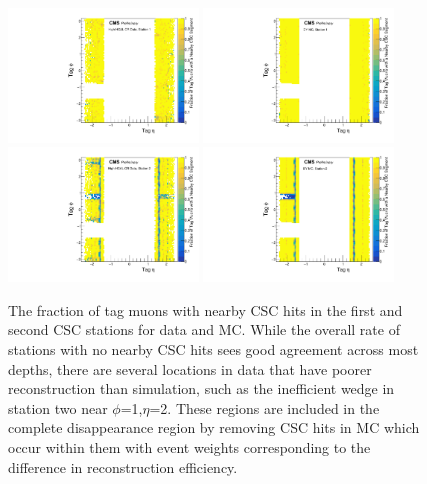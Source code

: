 \begin{figure}[htbp]
    \includegraphics[width=0.45\textwidth]{figures/cscNearbyFracData_station0.pdf}
    \hspace{0.01\textwidth}
    \centering
    \includegraphics[width=0.45\textwidth]{figures/cscNearbyFracMC_station0.pdf}
    \includegraphics[width=0.45\textwidth]{figures/cscNearbyFracData_station1.pdf}
    \hspace{0.01\textwidth}
    \includegraphics[width=0.45\textwidth]{figures/cscNearbyFracMC_station1.pdf}
	\caption[CSC segment efficiencies for stations one and two]{The fraction of tag muons with nearby CSC hits in the first and second CSC stations for data and MC. While the overall rate of stations with no nearby CSC hits sees good agreement across most depths, there are several locations in data that have poorer reconstruction than simulation, such as the inefficient wedge in station two near $\phi$=1,$\eta$=2. These regions are included in the complete disappearance region by removing CSC hits in MC which occur within them with event weights corresponding to the difference in reconstruction efficiency.}
    \label{fig:CSCeff}

\end{figure}
